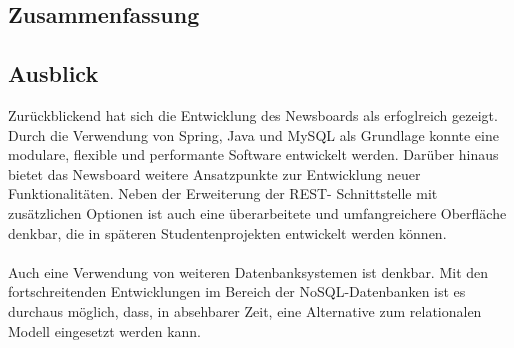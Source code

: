 \subsection{Zusammenfassung}

\subsection{Ausblick}
Zurückblickend hat sich die Entwicklung des Newsboards als erfoglreich gezeigt. Durch die
Verwendung von Spring, Java und MySQL als Grundlage konnte eine modulare, flexible und 
performante Software entwickelt werden. Darüber hinaus bietet das Newsboard weitere
Ansatzpunkte zur Entwicklung neuer Funktionalitäten. Neben der Erweiterung der REST-
Schnittstelle mit zusätzlichen Optionen ist auch eine überarbeitete und umfangreichere 
Oberfläche denkbar, die in späteren Studentenprojekten entwickelt werden können.
\\ \\
Auch eine Verwendung von weiteren Datenbanksystemen ist denkbar. Mit den fortschreitenden
Entwicklungen im Bereich der NoSQL-Datenbanken ist es durchaus möglich, dass, in absehbarer
Zeit, eine Alternative zum relationalen Modell eingesetzt werden kann. 
